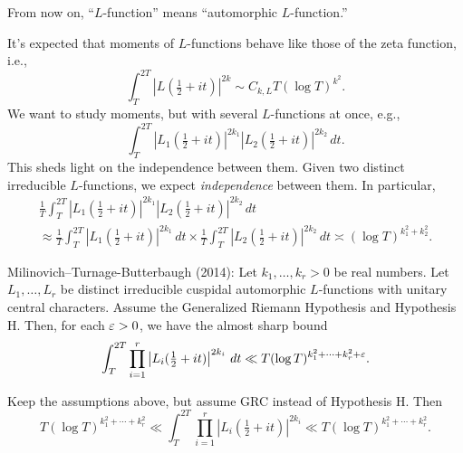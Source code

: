 \documentclass[reqno]{amsart} 
\begin{document}
From now on, ``$L$-function'' means ``automorphic $L$-function.''

It's expected that moments of $L$-functions behave like those of the zeta function, i.e.,
\begin{equation*}
  \int_T^{2 T} \left| L(\tfrac{1}{2} + i t) \right|^{2 k} \sim C_{k, L} T(\log T)^{k^2}.
\end{equation*}
We want to study moments, but with several $L$-functions at once, e.g.,
\begin{equation*}
  \int_T^{2 T}
  \left| L_1(\tfrac{1}{2} + i t) \right|^{2 k_1}
  \left| L_2(\tfrac{1}{2} + i t) \right|^{2 k_2} \, d t.
\end{equation*}
This sheds light on the independence between them.  Given two distinct irreducible $L$-functions, we expect \emph{independence} between them.  In particular,
\begin{multline*}
  \frac{1}{T} \int_T^{2 T}
  \left| L_1(\tfrac{1}{2} + i t) \right|^{2 k_1}
  \left| L_2(\tfrac{1}{2} + i t) \right|^{2 k_2} \, d t
  \\
  \approx
  \frac{1}{T}
  \int_T^{2 T}
  \left| L_1(\tfrac{1}{2} + i t) \right|^{2 k_1} \, d t
  \times \frac{1}{T}
  \int_T^{2 T}
  \left| L_2(\tfrac{1}{2} + i t) \right|^{2 k_2} \, d t
  \asymp(\log T)^{k_1^2 + k_2^2}.
\end{multline*}

Milinovich--Turnage-Butterbaugh (2014): Let $k _1, \dotsc, k_r > 0$ be real numbers.  Let $L_1, \dotsc, L_r$ be distinct irreducible cuspidal automorphic $L$-functions with unitary central characters.  Assume the Generalized Riemann Hypothesis and Hypothesis H.  Then, for each $\varepsilon > 0$, we have the almost sharp bound
\begin{equation*}
  \int_T^{2 T} \prod_{i = 1}^r \left| L_i(\tfrac{1}{2} + i t) \right|^{2 k_i} \, d t
  \ll T(\log T)^{k_1^2 + \dotsb + k_r^2 + \varepsilon}.
\end{equation*}

\begin{theorem}[H.\ 2024+]
  Keep the assumptions above, but assume GRC instead of Hypothesis H.  Then
  \begin{equation*}
    T(\log T)^{k_1^2 + \dotsb + k_r^2} \ll \int_T^{2 T}
    \prod_{i = 1}^r
    \left| L_i(\tfrac{1}{2} + it) \right|^{2 k_i}
    \ll T(\log T)^{k_1^2 + \dotsb + k_r^2}.
  \end{equation*}
\end{theorem}
\end{document}
